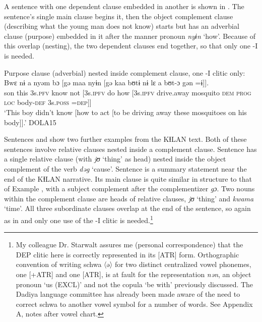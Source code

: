 \documentclass[output=paper]{langscibook}
\begin{document}
A sentence with one dependent clause embedded in another is shown in . The sentence's single main clause begins it, then the object complement clause (describing what the young man does not know) starts but has an adverbial clause (purpose) embedded in it after the manner pronoun \textit{nyɨn} `how'. Because of this overlap (nesting), the two dependent clauses end together, so that only one -I is needed.

\ea Purpose clause (adverbial) nested inside complement clause, one -I clitic only:
\label{ex:dettweiler:DOLA15} \\
\gll Bwɛ nɨ a nyəm bɔ [gə maa nyɨn [gə kaa bʊtɨ nɨ lɛ a bʊt-ɔ gən =ɨ]]. \\
son this 3s.\textsc{pfv} know not [3s.\textsc{ipfv} do how [3s.\textsc{ipfv} drive.away mosquito \textsc{dem} \textsc{prog} \textsc{loc} body-\textsc{def} 3s.\textsc{poss} =\textsc{dep}]] \\
\glt `This boy didn't know [how to act [to be driving away these mosquitoes on his body]].' DOLA15
\z

\noindent Sentences  and  show two further examples from the KƗLAN text. Both of these sentences involve relative clauses nested inside a complement clause. Sentence  has a single relative clause (with \textit{jʊ} `thing' as head) nested inside the object complement of the verb \textit{dəg} `cause'. Sentence  is a summary statement near the end of the KƗLAN narrative. Its main clause is quite similar in structure to that of Example , with a subject complement after the complementizer \textit{gɔ}. Two nouns within the complement clause are heads of relative clauses, \textit{jʊ} `thing' and \textit{kwama} `time'. All three subordinate clauses overlap at the end of the sentence, so again as in  and  only one use of the -I clitic is needed.\footnote{My colleague Dr. Starwalt assures me (personal correspondence) that the DEP clitic here is correctly represented in its [\textminus ATR] form. Orthographic convention of writing schwa 〈ə〉 for two distinct centralized vowel phonemes, one [+ATR] and one [\textminus ATR], is at fault for the representation \textit{nən}, an object pronoun `us (EXCL)' and not the copula `be with' previously discussed. The Dadiya language committee has already been made aware of the need to correct schwa to another vowel symbol for a number of words. See Appendix A, notes after vowel chart.}
\end{document}
